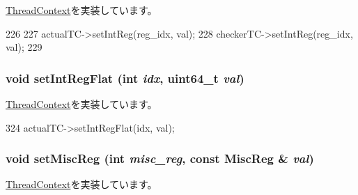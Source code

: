 \hyperlink{classThreadContext_a995ac11ab79af59e135d473df10c72da}{ThreadContext}を実装しています。


\begin{DoxyCode}
226     {
227         actualTC->setIntReg(reg_idx, val);
228         checkerTC->setIntReg(reg_idx, val);
229     }
\end{DoxyCode}
\hypertarget{classCheckerThreadContext_ae3b8c9c2c1ae95767f0703357957a3f8}{
\subsubsection[{setIntRegFlat}]{\setlength{\rightskip}{0pt plus 5cm}void setIntRegFlat (int {\em idx}, \/  uint64\_\-t {\em val})}}
\label{classCheckerThreadContext_ae3b8c9c2c1ae95767f0703357957a3f8}


\hyperlink{classThreadContext_a017c099cd6087484b0eb1892809b0572}{ThreadContext}を実装しています。


\begin{DoxyCode}
324     { actualTC->setIntRegFlat(idx, val); }
\end{DoxyCode}
\hypertarget{classCheckerThreadContext_a1877dde4f3eb17a8b7d33ea40176c148}{
\subsubsection[{setMiscReg}]{\setlength{\rightskip}{0pt plus 5cm}void setMiscReg (int {\em misc\_\-reg}, \/  const {\bf MiscReg} \& {\em val})}}
\label{classCheckerThreadContext_a1877dde4f3eb17a8b7d33ea40176c148}


\hyperlink{classThreadContext_a074166dc2fe3c4aea3ad588ed9883c51}{ThreadContext}を実装しています。


